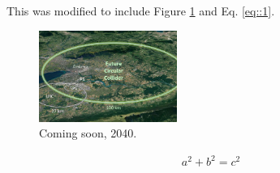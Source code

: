 
This was modified to include Figure \ref{fig::1} and Eq. \eqref{eq::1}.

\vspace{0.5cm}
\begin{figure}[h]
\centering
\includegraphics[width=0.4\textwidth]{Images/fcc.jpg}
\caption{\label{fig:frog}Coming soon, 2040.}
\label{fig::1}
\end{figure}

\begin{gather}
a^2+b^2=c^2
\label{eq::1}
\end{gather}
